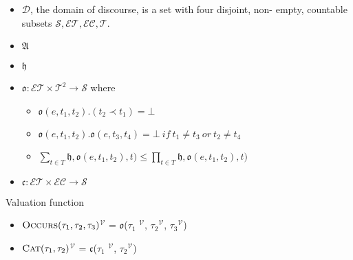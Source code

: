 \begin{itemize}
	\item $\mathcal{D}$,  the domain of discourse, is a set with four disjoint, non-
	      empty, countable subsets $\mathcal{S} , \mathcal{ET}, \mathcal{EC},  \mathcal{T}$.
	\item $\mathfrak{A}$

	\item $\mathfrak{h}$

	\item $\mathfrak{o} : \mathcal{ET} \times \mathcal{T}^2 \to \mathcal{S}$ where
	      \begin{itemize}
		      \item $\mathfrak{o}(e, t_1, t_2) . (t_2 \prec t_1) = \bot$
		      \item $\mathfrak{o}(e, t_1, t_2) . \mathfrak{o}(e, t_3, t_4) = \bot  \ if \ t_1 \neq t_3 \ or \  t_2 \neq t_4$
		      \item $\displaystyle \sum_{t\in T} \mathfrak{h}, \mathfrak{o}(e, t_1, t_2), t) \leq \prod_{t\in T} \mathfrak{h}, \mathfrak{o}(e, t_1, t_2), t)$
	      \end{itemize}
	\item $\mathfrak{c} : \mathcal{ET} \times \mathcal{EC} \to \mathcal{S}$
\end{itemize}

\begin{defn}Valuation function
	\begin{itemize}
		\item  \textlbrackdbl $\textsc{Occurs}(\tau_1, \tau_2, \tau_3)$\textrbrackdbl$^{\mathcal{V}}$
		      = $\mathfrak{o}$(\textlbrackdbl $\tau_1$ \textrbrackdbl$^{\mathcal{V}}$,
		      \textlbrackdbl $\tau_2$\textrbrackdbl$^{\mathcal{V}}$, \textlbrackdbl $\tau_3$\textrbrackdbl$^{\mathcal{V}}$)

		\item  \textlbrackdbl $\textsc{Cat}(\tau_1, \tau_2)$\textrbrackdbl$^{\mathcal{V}}$
		      = $\mathfrak{c}$(\textlbrackdbl $\tau_1$ \textrbrackdbl$^{\mathcal{V}}$,
		      \textlbrackdbl $\tau_2$\textrbrackdbl$^{\mathcal{V}}$)
	\end{itemize}
\end{defn}
